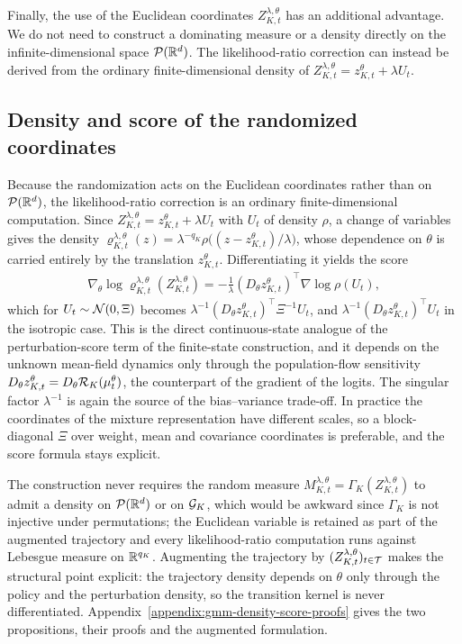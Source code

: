 Finally, the use of the Euclidean coordinates $Z_{K,t}^{\lambda,\theta}$ has an additional advantage. We do not need to construct a dominating measure or a density directly on the infinite-dimensional space ${\cal P}(\mathbb{R}^d)$. The likelihood-ratio correction can instead be derived from the ordinary finite-dimensional density of $Z_{K,t}^{\lambda,\theta} = z_{K,t}^\theta + \lambda U_t$.

\subsection{Density and score of the randomized coordinates}
\label{subsec:gmm-density-score}

Because the randomization acts on the Euclidean coordinates rather than on ${\cal P}(\mathbb{R}^d)$, the likelihood-ratio correction is an ordinary finite-dimensional computation. Since $Z_{K,t}^{\lambda,\theta}=z_{K,t}^\theta+\lambda U_t$ with $U_t$ of density $\rho$, a change of variables gives the density $\varrho_{K,t}^{\lambda,\theta}(z)=\lambda^{-q_K}\rho\big((z-z_{K,t}^\theta)/\lambda\big)$, whose dependence on $\theta$ is carried entirely by the translation $z_{K,t}^\theta$. Differentiating it yields the score
\begin{align}
    \nabla_\theta\log\varrho_{K,t}^{\lambda,\theta}\left(Z_{K,t}^{\lambda,\theta}\right)
    = -\frac{1}{\lambda}\left(D_\theta z_{K,t}^\theta\right)^\top\nabla\log\rho(U_t),
    \label{eq:gmm-coordinate-score-sampled}
\end{align}
which for $U_t\sim{\cal N}(0,\Xi)$ becomes $\lambda^{-1}(D_\theta z_{K,t}^\theta)^\top\Xi^{-1}U_t$, and $\lambda^{-1}(D_\theta z_{K,t}^\theta)^\top U_t$ in the isotropic case. This is the direct continuous-state analogue of the perturbation-score term of the finite-state construction, and it depends on the unknown mean-field dynamics only through the population-flow sensitivity $D_\theta z_{K,t}^\theta=D_\theta{\cal R}_K(\mu_t^\theta)$, the counterpart of the gradient of the logits. The singular factor $\lambda^{-1}$ is again the source of the bias--variance trade-off. In practice the coordinates of the mixture representation have different scales, so a block-diagonal $\Xi$ over weight, mean and covariance coordinates is preferable, and the score formula stays explicit.

The construction never requires the random measure $M_{K,t}^{\lambda,\theta}=\Gamma_K(Z_{K,t}^{\lambda,\theta})$ to admit a density on ${\cal P}(\mathbb{R}^d)$ or on ${\cal G}_K$, which would be awkward since $\Gamma_K$ is not injective under permutations; the Euclidean variable is retained as part of the augmented trajectory and every likelihood-ratio computation runs against Lebesgue measure on $\mathbb{R}^{q_K}$. Augmenting the trajectory by $(Z_{K,t}^{\lambda,\theta})_{t\in{\cal T}}$ makes the structural point explicit: the trajectory density depends on $\theta$ only through the policy and the perturbation density, so the transition kernel is never differentiated. Appendix~\ref{appendix:gmm-density-score-proofs} gives the two propositions, their proofs and the augmented formulation.


